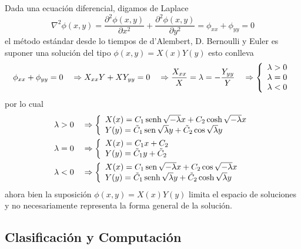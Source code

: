 \documentclass[spanish,titlepage,11pt]{article}
\begin{document}
Dada una ecuaci\'{o}n diferencial, digamos de Laplace
\[
\nabla^{2}\phi\left(  x,y\right)  =\frac{\partial^{2}\phi\left(  x,y\right)
}{\partial x^{2}}+\frac{\partial^{2}\phi\left(  x,y\right)  }{\partial y^{2}%
}=\phi_{xx}+\phi_{yy}=0
\]
el m\'{e}todo est\'{a}ndar desde lo tiempos de d'Alembert, D. Bernoulli y
Euler es suponer una soluci\'{o}n del tipo $\phi\left(  x,y\right)  =X\left(
x\right)  Y\left(  y\right)  $ esto conlleva
\[
\phi_{xx}+\phi_{yy}=0\quad\Rightarrow X_{xx}Y+XY_{yy}=0\quad\Rightarrow
\dfrac{X_{xx}}{X}=\lambda=-\dfrac{Y_{yy}}{Y}\quad\Rightarrow\left\{
\begin{array}
[c]{c}%
\lambda>0\\
\lambda=0\\
\lambda<0
\end{array}
\right.
\]
por lo cual
\begin{align*}
\lambda &  >0\quad\Rightarrow\left\{
\begin{array}
[c]{l}%
X(x)=C_{1}\operatorname*{senh}\sqrt{-\lambda}x+C_{2}\cosh\sqrt{-\lambda}x\\
Y(y)=\tilde{C}_{1}\operatorname*{sen}\sqrt{\lambda}y+\tilde{C}_{2}\cos
\sqrt{\lambda}y
\end{array}
\right. \\
\lambda &  =0\quad\Rightarrow\left\{
\begin{array}
[c]{l}%
X(x)=C_{1}x+C_{2}\\
Y(y)=\tilde{C}_{1}y+\tilde{C}_{2}%
\end{array}
\right. \\
\lambda &  <0\quad\Rightarrow\left\{
\begin{array}
[c]{l}%
X(x)=C_{1}\operatorname*{sen}\sqrt{-\lambda}x+C_{2}\cos\sqrt{-\lambda}x\\
Y(y)=\tilde{C}_{1}\operatorname*{senh}\sqrt{\lambda}y+\tilde{C}_{2}\cosh
\sqrt{\lambda}y
\end{array}
\right.
\end{align*}
ahora bien la suposici\'{o}n $\phi\left(  x,y\right)  =X\left(  x\right)
Y\left(  y\right)  $ limita el espacio de soluciones y no necesariamente
representa la forma general de la soluci\'{o}n.

\subsection{Clasificaci\'{o}n y Computaci\'{o}n}
\end{document}

